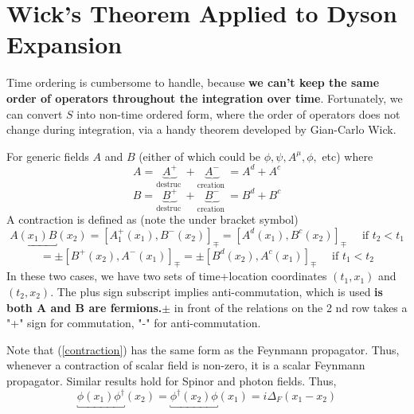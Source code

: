 \section{Wick's Theorem Applied to Dyson Expansion}
Time ordering is cumbersome to handle, because \textbf{we can't keep the same order of operators throughout the integration over time}. Fortunately, we can convert $S$ into non-time ordered form, where the order of operators does not change during integration, via a handy theorem developed by Gian-Carlo Wick.

\begin{qt}
For generic fields $A$ and $B$ (either of which could be $\phi, \psi, A^{\mu}, \phi,$ etc) where
$$
A=\underbrace{A^{+}}_{\text {destruc }}+\underbrace{A^{-}}_{\text {creation }}=A^{d}+A^{c}
$$
$$
B=\underbrace{B^{+}}_{\text {destruc }}+\underbrace{B^{-}}_{\text {creation }}=B^{d}+B^{c}
$$
A contraction is defined as (note the under bracket symbol)
\begin{equation}
\underbracket{A\left(x_{1}\right) B}\left(x_{2}\right)=\left[A_{1}^{+}\left(x_{1}\right), B^{-}\left(x_{2}\right)\right]_{\mp}=\left[A^{d}\left(x_{1}\right), B^{c}\left(x_{2}\right)\right]_{\mp} \quad \text { if } t_{2}<t_{1}
\end{equation}
\begin{equation}
=\pm\left[B^{+}\left(x_{2}\right), A^{-} \left(x_{1}\right)\right]_{\mp}=\pm\left[B^{d}\left(x_{2}\right), A^{c}\left(x_{1}\right)\right]_{\mp} \quad \text { if } t_{1}<t_{2}
\label{contraction}
\end{equation}
In these two cases, we have two sets of time+location coordinates $(t_1,x_1)$ and $(t_2,x_2)$. The plus sign subscript implies anti-commutation, which is used \textbf{is both A and B are fermions.}$\pm$ in front of the relations on the 2 nd row takes a "+" sign for commutation, "-" for anti-commutation. 
\end{qt}
Note that (\ref{contraction}) has the same form as the Feynmann propagator. Thus, whenever a contraction of scalar field is non-zero, it is a scalar Feynmann propagator. Similar results hold for Spinor and photon fields. Thus, 
\begin{equation}
    \underbracket{\phi\left(x_{1}\right) \phi^{\dagger}}\left(x_{2}\right)=\underbracket{\phi^{\dagger}\left(x_{2}\right) \phi}\left(x_{1}\right)=i \Delta_{F}\left(x_{1}-x_{2}\right)
    \label{contraction-scalar-field}
\end{equation}

